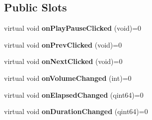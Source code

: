 \subsection*{Public Slots}
\begin{DoxyCompactItemize}
\item 
\hypertarget{class_abstract_control_a99d0d68402b7546c624e6bb7696ee95d}{virtual void {\bfseries on\-Play\-Pause\-Clicked} (void)=0}\label{class_abstract_control_a99d0d68402b7546c624e6bb7696ee95d}

\item 
\hypertarget{class_abstract_control_abdb7309086319e82a30dfbccea290d60}{virtual void {\bfseries on\-Prev\-Clicked} (void)=0}\label{class_abstract_control_abdb7309086319e82a30dfbccea290d60}

\item 
\hypertarget{class_abstract_control_a45d6fe6a83a66ae6f69e3b631fbdd547}{virtual void {\bfseries on\-Next\-Clicked} (void)=0}\label{class_abstract_control_a45d6fe6a83a66ae6f69e3b631fbdd547}

\item 
\hypertarget{class_abstract_control_a0d76bc546bc9bb2be13573814f43ede2}{virtual void {\bfseries on\-Volume\-Changed} (int)=0}\label{class_abstract_control_a0d76bc546bc9bb2be13573814f43ede2}

\item 
\hypertarget{class_abstract_control_a4aa7cd659eddd599b03df5d905cc1806}{virtual void {\bfseries on\-Elapsed\-Changed} (qint64)=0}\label{class_abstract_control_a4aa7cd659eddd599b03df5d905cc1806}

\item 
\hypertarget{class_abstract_control_a536755040aecaba6aff81a1704801ef6}{virtual void {\bfseries on\-Duration\-Changed} (qint64)=0}\label{class_abstract_control_a536755040aecaba6aff81a1704801ef6}

\end{DoxyCompactItemize}
